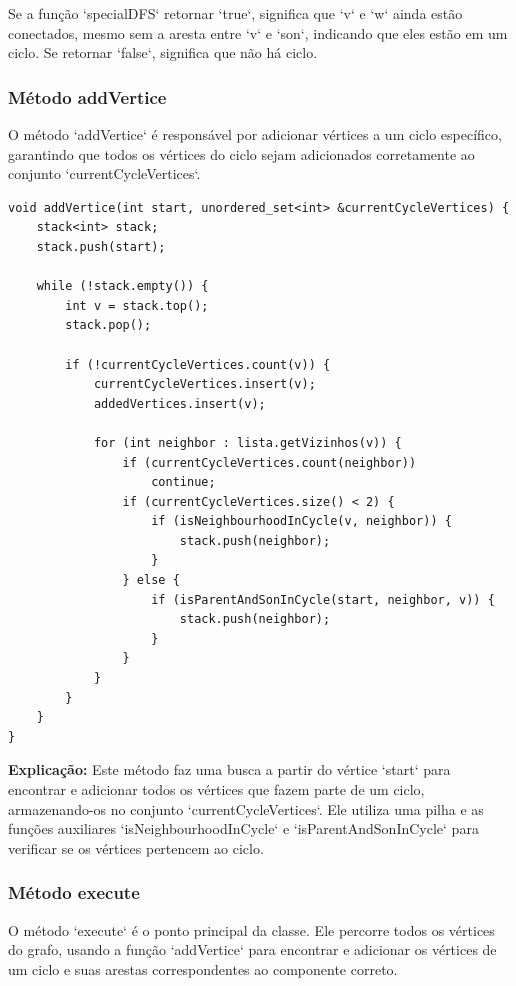 \documentclass[10pt,conference]{IEEEtran}
\begin{document}
Se a função `specialDFS` retornar `true`, significa que `v` e `w` ainda estão conectados, mesmo sem a aresta entre `v` e `son`, indicando que eles estão em um ciclo. Se retornar `false`, significa que não há ciclo.

\subsubsection{Método addVertice}

O método `addVertice` é responsável por adicionar vértices a um ciclo específico, garantindo que todos os vértices do ciclo sejam adicionados corretamente ao conjunto `currentCycleVertices`.

\begin{lstlisting}
void addVertice(int start, unordered_set<int> &currentCycleVertices) {
    stack<int> stack;
    stack.push(start);

    while (!stack.empty()) {
        int v = stack.top();
        stack.pop();

        if (!currentCycleVertices.count(v)) {
            currentCycleVertices.insert(v);
            addedVertices.insert(v);

            for (int neighbor : lista.getVizinhos(v)) {
                if (currentCycleVertices.count(neighbor))
                    continue;
                if (currentCycleVertices.size() < 2) {
                    if (isNeighbourhoodInCycle(v, neighbor)) {
                        stack.push(neighbor);
                    }
                } else {
                    if (isParentAndSonInCycle(start, neighbor, v)) {
                        stack.push(neighbor);
                    }
                }
            }
        }
    }
}
\end{lstlisting}

\textbf{Explicação:} Este método faz uma busca a partir do vértice `start` para encontrar e adicionar todos os vértices que fazem parte de um ciclo, armazenando-os no conjunto `currentCycleVertices`. Ele utiliza uma pilha e as funções auxiliares `isNeighbourhoodInCycle` e `isParentAndSonInCycle` para verificar se os vértices pertencem ao ciclo.

\subsubsection{Método execute}

O método `execute` é o ponto principal da classe. Ele percorre todos os vértices do grafo, usando a função `addVertice` para encontrar e adicionar os vértices de um ciclo e suas arestas correspondentes ao componente correto.
\end{document}
